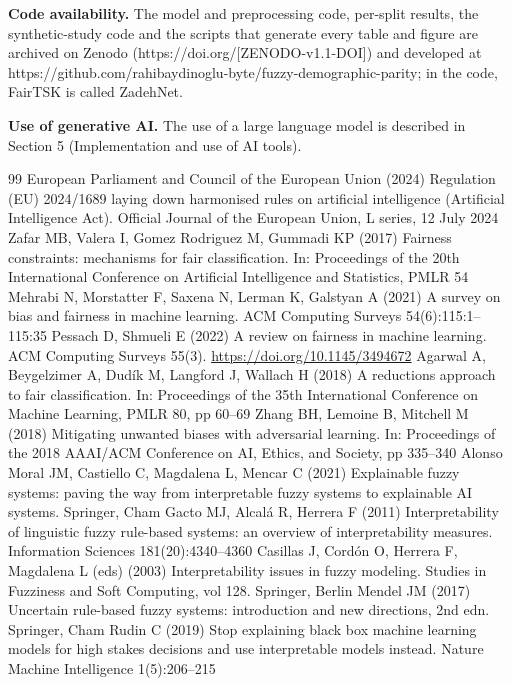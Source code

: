 \documentclass[pdflatex,sn-basic,Numbered,lineno]{sn-jnl}
\begin{document}
\textbf{Code availability.} The model and preprocessing code, per-split results, the synthetic-study code and the scripts that generate every table and figure are archived on Zenodo \cite{software} (https://doi.org/{[}ZENODO-v1.1-DOI{]}) and developed at https://github.com/rahibaydinoglu-byte/fuzzy-demographic-parity; in the code, FairTSK is called ZadehNet.

\textbf{Use of generative AI.} The use of a large language model is described in Section 5 (Implementation and use of AI tools).

\begin{thebibliography}{99}
 European Parliament and Council of the European Union (2024) Regulation (EU) 2024/1689 laying down harmonised rules on artificial intelligence (Artificial Intelligence Act). Official Journal of the European Union, L series, 12 July 2024
 Zafar MB, Valera I, Gomez Rodriguez M, Gummadi KP (2017) Fairness constraints: mechanisms for fair classification. In: Proceedings of the 20th International Conference on Artificial Intelligence and Statistics, PMLR 54
 Mehrabi N, Morstatter F, Saxena N, Lerman K, Galstyan A (2021) A survey on bias and fairness in machine learning. ACM Computing Surveys 54(6):115:1–115:35
 Pessach D, Shmueli E (2022) A review on fairness in machine learning. ACM Computing Surveys 55(3). \url{https://doi.org/10.1145/3494672}
 Agarwal A, Beygelzimer A, Dudík M, Langford J, Wallach H (2018) A reductions approach to fair classification. In: Proceedings of the 35th International Conference on Machine Learning, PMLR 80, pp 60–69
 Zhang BH, Lemoine B, Mitchell M (2018) Mitigating unwanted biases with adversarial learning. In: Proceedings of the 2018 AAAI/ACM Conference on AI, Ethics, and Society, pp 335–340
 Alonso Moral JM, Castiello C, Magdalena L, Mencar C (2021) Explainable fuzzy systems: paving the way from interpretable fuzzy systems to explainable AI systems. Springer, Cham
 Gacto MJ, Alcalá R, Herrera F (2011) Interpretability of linguistic fuzzy rule-based systems: an overview of interpretability measures. Information Sciences 181(20):4340–4360
 Casillas J, Cordón O, Herrera F, Magdalena L (eds) (2003) Interpretability issues in fuzzy modeling. Studies in Fuzziness and Soft Computing, vol 128. Springer, Berlin
 Mendel JM (2017) Uncertain rule-based fuzzy systems: introduction and new directions, 2nd edn. Springer, Cham
 Rudin C (2019) Stop explaining black box machine learning models for high stakes decisions and use interpretable models instead. Nature Machine Intelligence 1(5):206–215

\end{thebibliography}
\end{document}

